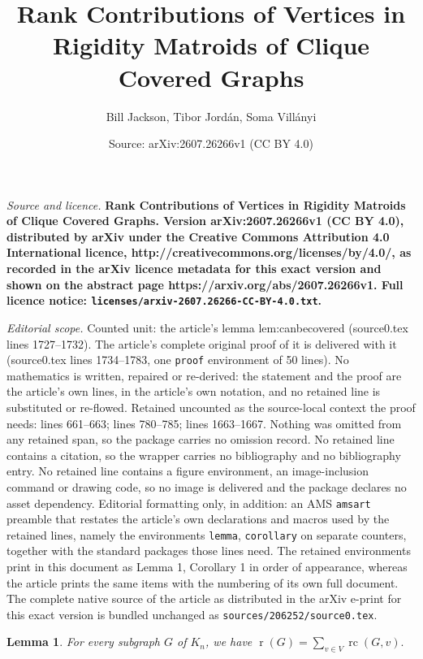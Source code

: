 \documentclass[10pt,a4paper]{amsart}
\title{\bf Rank Contributions of Vertices in Rigidity Matroids of Clique Covered Graphs}
\author{Bill Jackson, Tibor Jord\'an, Soma Vill\'anyi}
\date{Source: arXiv:2607.26266v1 (CC BY 4.0)}
\newtheorem{lemma}{Lemma}
\DeclareMathOperator{\rc}{rc}
\DeclareMathOperator{\rr}{r}
\begin{document}
\maketitle

\noindent\emph{Source and licence.} \bf Rank Contributions of Vertices in Rigidity Matroids of Clique Covered Graphs. Version arXiv:2607.26266v1 (CC BY 4.0), distributed by arXiv under the Creative Commons Attribution 4.0 International licence, http://creativecommons.org/licenses/by/4.0/, as recorded in the arXiv licence metadata for this exact version and shown on the abstract page https://arxiv.org/abs/2607.26266v1. Full licence notice: \texttt{licenses/arxiv-2607.26266-CC-BY-4.0.txt}.\par\smallskip

\noindent\textit{Editorial scope.} Counted unit: the article's lemma lem:canbecovered (source0.tex lines 1727--1732). The article's complete original proof of it is delivered with it (source0.tex lines 1734--1783, one \texttt{proof} environment of 50 lines). No mathematics is written, repaired or re-derived: the statement and the proof are the article's own lines, in the article's own notation, and no retained line is substituted or re-flowed.  Retained uncounted as the source-local context the proof needs: lines 661--663; lines 780--785; lines 1663--1667.  Nothing was omitted from any retained span, so the package carries no omission record.  No retained line contains a citation, so the wrapper carries no bibliography and no bibliography entry.  No retained line contains a figure environment, an image-inclusion command or drawing code, so no image is delivered and the package declares no asset dependency.  Editorial formatting only, in addition: an AMS \texttt{amsart} preamble that restates the article's own declarations and macros used by the retained lines, namely the environments \texttt{lemma}, \texttt{corollary} on separate counters, together with the standard packages those lines need.  The retained environments print in this document as Lemma 1, Corollary 1 in order of appearance, whereas the article prints the same items with the numbering of its own full document.  The complete native source of the article as distributed in the arXiv e-print for this exact version is bundled unchanged as \texttt{sources/206252/source0.tex}.
\begin{lemma} \label{lem:rc_sum}
For every subgraph $G$ of $K_n$, we have ${\displaystyle \rr(G)=\sum_{v\in V} \rc(G,v)}.$ 
\end{lemma} 
\end{document}
